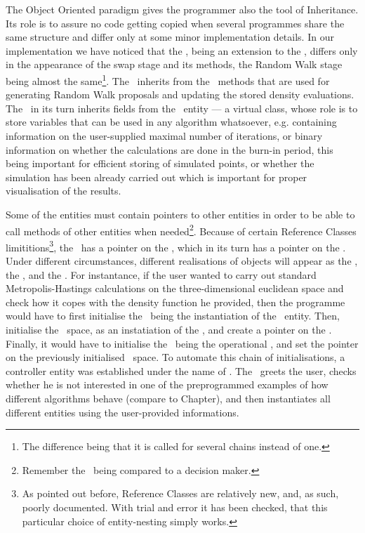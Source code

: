 \documentclass{book}
\begin{document}
The Object Oriented paradigm gives the programmer also the tool of Inheritance. Its role is to assure no code getting copied when several programmes share the same structure and differ only at some minor implementation details. In our implementation we have noticed that the \PTalgo, being an extension to the \MH, differs only in the appearance of the swap stage and its methods, the Random Walk stage being almost the same\footnote{The difference being that it is called for several chains instead of one.}. The \PTalgo\, inherits from the \MH\, methods that are used for generating Random Walk proposals and updating the stored density evaluations. The \MH\, in its turn inherits fields from the \algo\, entity --- a virtual class, whose role is to store variables that can be used in any algorithm whatsoever, e.g. containing information on the user-supplied maximal number of iterations, or binary information on whether the calculations are done in the burn-in period, this being important for efficient storing of simulated points, or whether the simulation has been already carried out which is important for proper visualisation of the results. 

Some of the entities must contain pointers to other entities in order to be able to call methods of other entities when needed\footnote{Remember the \algo\, being compared to a decision maker.}. Because of certain Reference Classes limititions\footnote{As pointed out before, Reference Classes are relatively new, and, as such, poorly documented. With trial and error it has been checked, that this particular choice of entity-nesting simply works.}, the \algo\, has a pointer on the \sspace, which in its turn has a pointer on the \measure. Under different circumstances, different realisations of objects will appear as the \algo, the \sspace, and the \measure. For instantance, if the user wanted to carry out standard Metropolis-Hastings calculations on the three-dimensional euclidean space and check how it copes with the density function he provided, then the programme would have to first  initialise the \udensity\, being the instantiation of the \measure\, entity. Then, initialise the \rspace\, space, as an instatiation of the \sspace, and create a pointer on the \udensity. Finally, it would have to initialise the \MH\, being the operational \algo, and set the pointer on the previously initialised \rspace\, space. To automate this chain of initialisations, a controller entity was established under the name of \simulation. The \simulation\, greets the user, checks whether he is not interested in one of the preprogrammed examples of how different algorithms behave (compare to Chapter), and then instantiates all different entities using the user-provided informations. 
\end{document}
